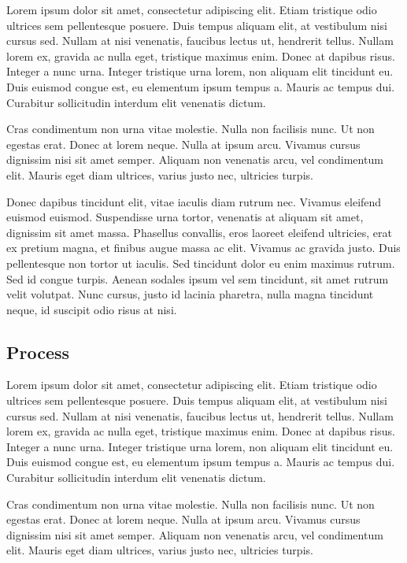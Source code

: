 \documentclass[11pt, a4paper]{resources/JTH}
\begin{document}
Lorem ipsum dolor sit amet, consectetur adipiscing elit. Etiam tristique odio ultrices sem pellentesque posuere. Duis tempus aliquam elit, at vestibulum nisi cursus sed. Nullam at nisi venenatis, faucibus lectus ut, hendrerit tellus. Nullam lorem ex, gravida ac nulla eget, tristique maximus enim. Donec at dapibus risus. Integer a nunc urna. Integer tristique urna lorem, non aliquam elit tincidunt eu. Duis euismod congue est, eu elementum ipsum tempus a. Mauris ac tempus dui. Curabitur sollicitudin interdum elit venenatis dictum\cite{beck2003test}.

Cras condimentum non urna vitae molestie. Nulla non facilisis nunc. Ut non egestas erat. Donec at lorem neque. Nulla at ipsum arcu. Vivamus cursus dignissim nisi sit amet semper. Aliquam non venenatis arcu, vel condimentum elit. Mauris eget diam ultrices, varius justo nec, ultricies turpis.

Donec dapibus tincidunt elit, vitae iaculis diam rutrum nec. Vivamus eleifend euismod euismod. Suspendisse urna tortor, venenatis at aliquam sit amet, dignissim sit amet massa. Phasellus convallis, eros laoreet eleifend ultricies, erat ex pretium magna, et finibus augue massa ac elit. Vivamus ac gravida justo. Duis pellentesque non tortor ut iaculis. Sed tincidunt dolor eu enim maximus rutrum. Sed id congue turpis. Aenean sodales ipsum vel sem tincidunt, sit amet rutrum velit volutpat. Nunc cursus, justo id lacinia pharetra, nulla magna tincidunt neque, id suscipit odio risus at nisi.

\subsection{Process}

Lorem ipsum dolor sit amet, consectetur adipiscing elit. Etiam tristique odio ultrices sem pellentesque posuere. Duis tempus aliquam elit, at vestibulum nisi cursus sed. Nullam at nisi venenatis, faucibus lectus ut, hendrerit tellus. Nullam lorem ex, gravida ac nulla eget, tristique maximus enim. Donec at dapibus risus. Integer a nunc urna. Integer tristique urna lorem, non aliquam elit tincidunt eu. Duis euismod congue est, eu elementum ipsum tempus a. Mauris ac tempus dui. Curabitur sollicitudin interdum elit venenatis dictum.

Cras condimentum non urna vitae molestie. Nulla non facilisis nunc. Ut non egestas erat. Donec at lorem neque. Nulla at ipsum arcu. Vivamus cursus dignissim nisi sit amet semper. Aliquam non venenatis arcu, vel condimentum elit. Mauris eget diam ultrices, varius justo nec, ultricies turpis.
\end{document}
